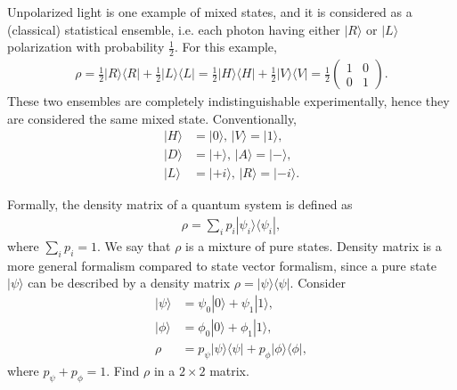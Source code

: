 \documentclass{beamer}
\begin{document}
\begin{frame}
\justify
Unpolarized light is one example of mixed states, and it is considered as a (classical) statistical ensemble, i.e. each photon having either $|R\rangle$ or $|L\rangle$ polarization with probability $\frac{1}{2}$.
\vfill
For this example,
\begin{align}
\rho = \frac{1}{2}|R\rangle \langle R| + \frac{1}{2}|L\rangle \langle L| = \frac{1}{2}|H\rangle \langle H| + \frac{1}{2}|V\rangle \langle V| = \frac{1}{2} \begin{pmatrix} 1 & 0 \\ 0 & 1 \end{pmatrix}.
\end{align}
\vfill
These two ensembles are completely indistinguishable experimentally, hence they are considered the same mixed state.
\vfill
Conventionally,
\begin{align}
|H\rangle & = |0\rangle,\, |V\rangle = |1\rangle, \\
|D\rangle & = |+\rangle,\, |A\rangle = |-\rangle, \\
|L\rangle & = |+i\rangle,\, |R\rangle = |-i\rangle.
\end{align}
\end{frame}

\begin{frame}
\justify
Formally, the density matrix of a quantum system is defined as
\begin{align}
\rho = \sum_i p_i |\psi_i\rangle \langle\psi_i|,
\end{align}
where $\sum_i p_i = 1$. We say that $\rho$ is a mixture of pure states.
\vfill
Density matrix is a more general formalism compared to state vector formalism, since a pure state $|\psi\rangle$ can be described by a density matrix $\rho = |\psi\rangle \langle\psi|$.
\vfill
Consider
\begin{align}
|\psi\rangle & = \psi_0|0\rangle + \psi_1|1\rangle, \\
|\phi\rangle & = \phi_0|0\rangle + \phi_1|1\rangle, \\
\rho & = p_\psi |\psi\rangle \langle\psi| + p_\phi |\phi\rangle \langle\phi|,
\end{align}
where $p_\psi + p_\phi = 1$. Find $\rho$ in a $2 \times 2$ matrix.
\end{frame}
\end{document}
